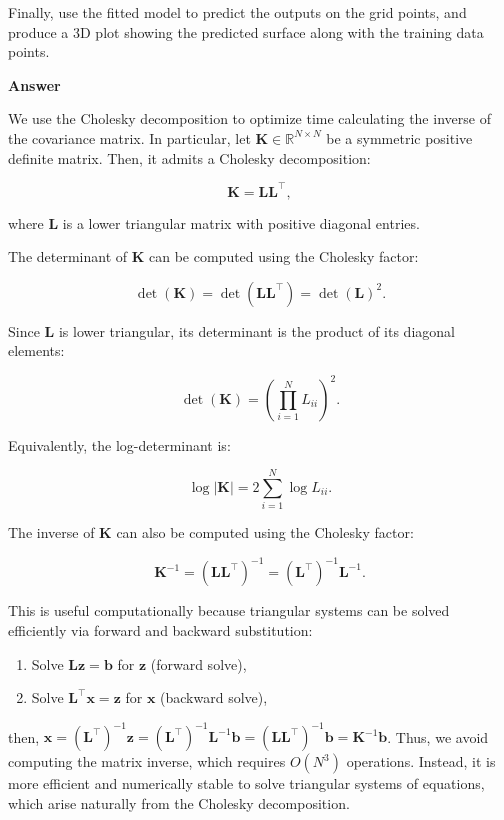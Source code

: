 \begin{enumerate}[leftmargin=*]
Finally, use the fitted model to predict the outputs on the grid points, and produce a 3D plot showing the predicted surface along with the training data points.

\textbf{Answer} 

We use the Cholesky decomposition to optimize time calculating the inverse of the covariance matrix. In particular, let \( \mathbf{K} \in \mathbb{R}^{N \times N} \) be a symmetric positive definite matrix. Then, it admits a Cholesky decomposition:
	
	\[
	\mathbf{K} = \mathbf{L} \mathbf{L}^\top,
	\]
	
	where \( \mathbf{L} \) is a lower triangular matrix with positive diagonal entries.
	
	The determinant of \( \mathbf{K} \) can be computed using the Cholesky factor:
	
	\[
	\det(\mathbf{K}) = \det(\mathbf{L} \mathbf{L}^\top) = \det(\mathbf{L})^2.
	\]
	
	Since \( \mathbf{L} \) is lower triangular, its determinant is the product of its diagonal elements:
	
	\[
	\det(\mathbf{K}) = \left( \prod_{i=1}^N L_{ii} \right)^2.
	\]
	
	Equivalently, the log-determinant is:
	
	\[
	\log |\mathbf{K}| = 2 \sum_{i=1}^N \log L_{ii}.
	\]
	
	The inverse of \( \mathbf{K} \) can also be computed using the Cholesky factor:
	
	\[
	\mathbf{K}^{-1} = (\mathbf{L} \mathbf{L}^\top)^{-1} = (\mathbf{L}^\top)^{-1} \mathbf{L}^{-1}.
	\]
	
	This is useful computationally because triangular systems can be solved efficiently via forward and backward substitution:
	
	\begin{enumerate}
		\item Solve \( \mathbf{L} \mathbf{z} = \mathbf{b} \) for \( \mathbf{z} \) (forward solve),
		\item Solve \( \mathbf{L}^\top \mathbf{x} = \mathbf{z} \) for \( \mathbf{x} \) (backward solve),
	\end{enumerate}
	
	then,  \( \mathbf{x} = (\mathbf{L}^\top)^{-1} \mathbf{z} = (\mathbf{L}^\top)^{-1} \mathbf{L}^{-1}  \mathbf{b} = (\mathbf{L}\mathbf{L}^\top)^{-1} \mathbf{b} = \mathbf{K}^{-1}  \mathbf{b} \).
	Thus, we avoid computing the matrix inverse, which requires \( O(N^3) \) operations. Instead, it is more efficient and numerically stable to solve triangular systems of equations, which arise naturally from the Cholesky decomposition.
	

\end{enumerate}
